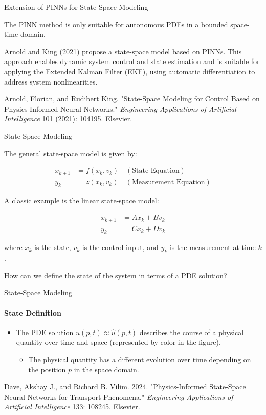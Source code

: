 \begin{frame}{Extension of PINNs for State-Space Modeling}

The PINN method is only suitable for autonomous PDEs in a bounded space-time domain.
    
Arnold and King (2021) propose a state-space model based on PINNs. This approach enables dynamic system control and state estimation and is suitable for applying the Extended Kalman Filter (EKF), using automatic differentiation to address system nonlinearities.
    
{\tiny Arnold, Florian, and Rudibert King. "State-Space Modeling for Control Based on Physics-Informed Neural Networks." \textit{Engineering Applications of Artificial Intelligence} 101 (2021): 104195. Elsevier.}
\end{frame}
    
\begin{frame}{State-Space Modeling}
    
The general state-space model is given by:
    
\begin{align}
x_{k+1} &= f(x_k, v_k) \quad (\text{State Equation})\\
y_k &= z(x_k, v_k) \quad (\text{Measurement Equation})
\end{align}
    
A classic example is the linear state-space model:
    
\begin{align*}
x_{k+1} &= A x_k + B v_k\\
y_k &= C x_k + D v_k
\end{align*}
    
where \(x_k\) is the state, \(v_k\) is the control input, and \(y_k\) is the measurement at time \(k\).
    
How can we define the state of the system in terms of a PDE solution?
\end{frame}
    
\begin{frame}{State-Space Modeling}
\framesubtitle{State Definition}
\begin{itemize}
    \item The PDE solution \(u(p, t) \approx \hat{u}(p, t)\) describes the course of a physical quantity over time and space (represented by color in the figure).
    \begin{itemize}
        \item The physical quantity has a different evolution over time depending on the position \(p\) in the space domain.
    \end{itemize}
\end{itemize}
\vspace{1cm}
\tiny{Dave, Akshay J., and Richard B. Vilim. 2024. "Physics-Informed State-Space Neural Networks for Transport Phenomena." \textit{Engineering Applications of Artificial Intelligence} 133: 108245. Elsevier.}
\end{frame}
    
